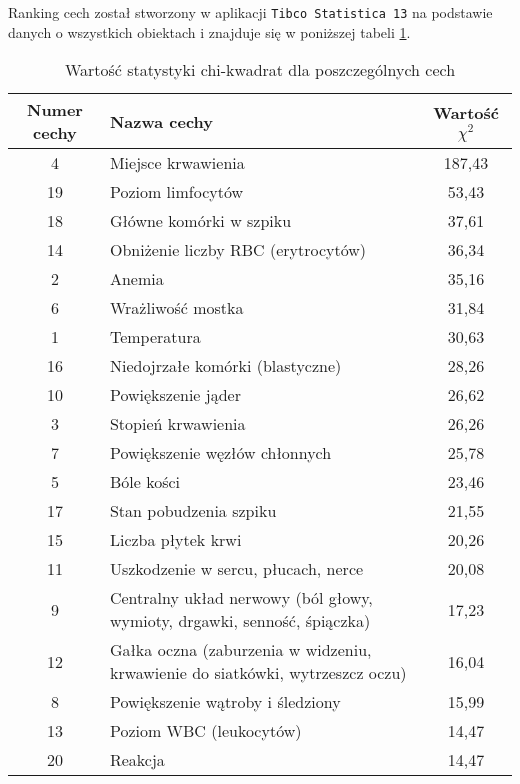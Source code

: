 \documentclass{article}
\begin{document}
Ranking cech został stworzony w aplikacji \texttt{Tibco Statistica 13} na podstawie danych o wszystkich obiektach i znajduje się w poniższej tabeli \ref{tab:ranking_cech}.
\begin{center}
	\begin{longtable}{ |c|l|c| } 
	\caption{Wartość statystyki chi-kwadrat dla poszczególnych cech}
		\label{tab:ranking_cech}\\
		\hline
			Numer cechy & Nazwa cechy & Wartość $\chi^2$ \\
		\hline
			4 & Miejsce krwawienia & 187,43 \\
		\hline	
			19 & Poziom limfocytów & 53,43 \\
		\hline	
			18 & Główne komórki w szpiku & 37,61 \\
		\hline	
			14 & Obniżenie liczby RBC (erytrocytów) & 36,34 \\
		\hline	
			2 & Anemia & 35,16 \\
		\hline	
			6 & Wrażliwość mostka & 31,84 \\
		\hline	
			1 & Temperatura & 30,63 \\
		\hline	
			16 & Niedojrzałe komórki (blastyczne) & 28,26 \\
		\hline	
			10 & Powiększenie jąder & 26,62 \\
		\hline	
			3 & Stopień krwawienia & 26,26 \\
		\hline	
			7 & Powiększenie węzłów chłonnych & 25,78 \\
		\hline	
			5 & Bóle kości & 23,46 \\
		\hline	
			17 & Stan pobudzenia szpiku & 21,55 \\
		\hline	
			15 & Liczba płytek krwi & 20,26 \\
		\hline	
			11 & Uszkodzenie w sercu, płucach, nerce & 20,08 \\
		\hline	
			9 & Centralny układ nerwowy (ból głowy, wymioty, drgawki, senność, śpiączka) & 17,23 \\
		\hline	
			12 & Gałka oczna (zaburzenia w widzeniu, krwawienie do siatkówki, wytrzeszcz oczu) & 16,04 \\
		\hline	
			8 & Powiększenie wątroby i śledziony & 15,99 \\
		\hline	
			13 & Poziom WBC (leukocytów) & 14,47 \\
		\hline	
			20 & Reakcja & 14,47 \\
		\hline
		
	\end{longtable}
\end{center}
\end{document}
